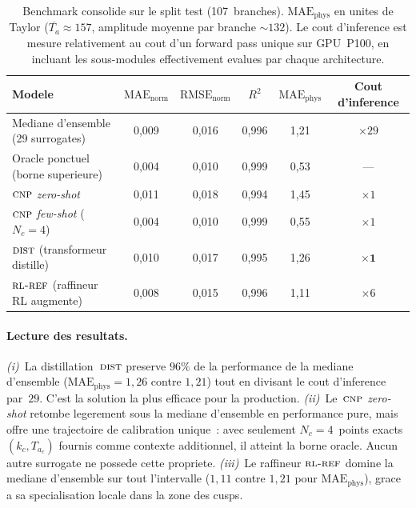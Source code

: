 \documentclass[11pt,a4paper]{article}
\newcommand{\Ta}{T_a}
\newcommand{\CNP}{\textsc{cnp}}              %
\newcommand{\DST}{\textsc{dist}}             %
\newcommand{\RLR}{\textsc{rl-ref}}           %
\begin{document}
\begin{table}[h]
\centering
\small
\begin{tabular}{l ccc cc}
\toprule
Modele
   & $\mathrm{MAE}_\text{norm}$
   & $\mathrm{RMSE}_\text{norm}$
   & $R^2$
   & $\mathrm{MAE}_\text{phys}$
   & Cout d'inference \\
\midrule
Mediane d'ensemble (29 surrogates)
   & 0{,}009 & 0{,}016 & 0{,}996 & 1{,}21 & $\times 29$ \\
Oracle ponctuel (borne superieure)
   & 0{,}004 & 0{,}010 & 0{,}999 & 0{,}53 & --- \\
\midrule
$\CNP$ \emph{zero-shot}
   & 0{,}011 & 0{,}018 & 0{,}994 & 1{,}45 & $\times 1$ \\
$\CNP$ \emph{few-shot} ($N_c=4$)
   & 0{,}004 & 0{,}010 & 0{,}999 & 0{,}55 & $\times 1$ \\
$\DST$ (transformeur distille)
   & 0{,}010 & 0{,}017 & 0{,}995 & 1{,}26 & $\bm{\times 1}$ \\
$\RLR$ (raffineur RL augmente)
   & 0{,}008 & 0{,}015 & 0{,}996 & 1{,}11 & $\times 6$ \\
\bottomrule
\end{tabular}
\caption{Benchmark consolide sur le split test (107~branches).
$\mathrm{MAE}_\text{phys}$ en unites de Taylor
($\overline{\Ta}\!\approx\!157$, amplitude moyenne par branche
$\sim\!132$). Le cout d'inference est mesure relativement au cout
d'un forward pass unique sur GPU~P100, en incluant les
sous-modules effectivement evalues par chaque architecture.}
\label{tab:bench}
\end{table}

\paragraph{Lecture des resultats.}
\emph{(i)}~La distillation~$\DST$ preserve $96\%$ de la performance
de la mediane d'ensemble ($\mathrm{MAE}_\text{phys}=1{,}26$ contre
$1{,}21$) tout en divisant le cout d'inference par~$29$. C'est la
solution la plus efficace pour la production.
\emph{(ii)}~Le~$\CNP$ \emph{zero-shot} retombe legerement sous la
mediane d'ensemble en performance pure, mais offre une trajectoire
de calibration unique~: avec seulement $N_c\!=\!4$~points exacts
$(k_c,\Ta_c)$ fournis comme contexte additionnel, il atteint la
borne oracle. Aucun autre surrogate ne possede cette propriete.
\emph{(iii)}~Le raffineur $\RLR$ domine la mediane d'ensemble
sur tout l'intervalle ($1{,}11$ contre $1{,}21$ pour
$\mathrm{MAE}_\text{phys}$), grace a sa specialisation locale
dans la zone des cusps.
\end{document}
